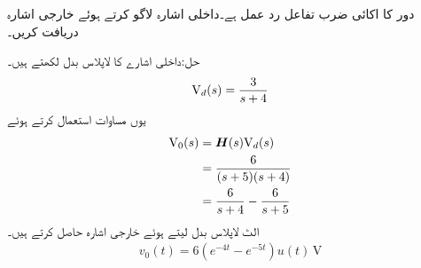 
دور کا اکائی ضرب تفاعل رد عمل  ہے۔داخلی اشارہ  لاگو کرتے ہوئے خارجی اشارہ  دریافت کریں۔

حل:داخلی اشارے کا لاپلاس بدل لکھتے ہیں۔
\begin{align*}
{\ensuremath{{\textup{V}}}}_d(s)=\frac{3}{s+4}
\end{align*}
یوں مساوات استعمال کرتے ہوئے
\begin{align*}
{\ensuremath{{\textup{V}}}}_0(s)&={{\boldsymbol{H}}}(s) {{\textup{V}}}_d(s)\\
&=\frac{6}{(s+5)(s+4)}\\
&=\frac{6}{s+4}-\frac{6}{s+5}
\end{align*}
الٹ لاپلاس بدل لیتے ہوئے خارجی اشارہ حاصل کرتے ہیں۔
\begin{align*}
v_0(t)=6\left(e^{-4t}-e^{-5t}\right)u(t)\,\si{\volt}
\end{align*}

